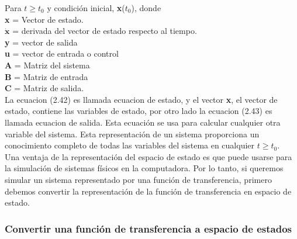 Para $t \geq t_0$ y condición inicial, \textbf{x}($t_0$), donde \\
\textbf{x} = Vector de estado.\\
$\dot{\textbf{x}}$ = derivada del vector de estado respecto al tiempo.\\
\textbf{y} = vector de salida\\
\textbf{u} = vector de entrada o control\\
\textbf{A} = Matriz del sistema\\
\textbf{B} = Matriz de entrada\\
\textbf{C} = Matriz de salida.\\
La ecuacion (2.42) es llamada ecuacion de estado, y el vector \textbf{x}, el vector de estado, contiene las variables de estado, por otro
lado la ecuacion (2.43) es llamada ecuacion de salida. Esta ecuación se usa para calcular cualquier otra variable del sistema. Esta
representación de un sistema proporciona un conocimiento completo de todas las variables del sistema en cualquier $t \geq t_0$.\\
Una ventaja de la representación del espacio de estado es que puede usarse para la simulación de sistemas físicos en la computadora. Por lo
tanto, si queremos simular un sistema representado por una función de transferencia, primero debemos convertir la representación de la función
de transferencia en espacio de estado.

\subsubsection{Convertir una función de transferencia a espacio de estados}

